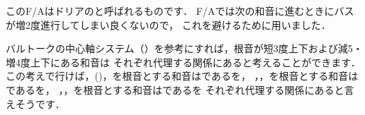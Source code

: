 \documentclass[dvipdfmx,uplatex,b5paper,openany,jbase=12Q,nomag*,textwidth-limit=44%
               ]{gachimuchi}[2020/05/05]
\begin{document}
\begin{NB}
このF/Aはドリアの\Gniv と呼ばれるものです．
F\Min/A\aFlat では次の和音に進むときにバスが増2度進行してしまい良くないので，
これを避けるために用いました．
\end{NB}

\begin{Yodan}
バルトークの中心軸システム（）を参考にすれば，根音が短3度上下および減5・増4度上下にある和音は
それぞれ代理する関係にあると考えることができます．
この考えで行けば\bFlat\Gniii ，\bFlat\Gnv (\bSharp\Gniv )，\Gnvi を根音とする和音はである\Gni を，
\Gnii ，\bFlat\Gnvi ，\Gnvii を根音とする和音はである\Gniv を，
\bFlat\Gnii ，\Gniii ，\bFlat\Gnvii を根音とする和音はである\Gnv を
それぞれ代理する関係にあると言えそうです．


\end{Yodan}
\end{document}
